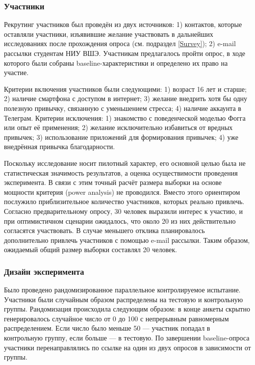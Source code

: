 \documentclass[pdflatex,sn-mathphys-num]{sn-jnl}%
\theoremstyle{thmstyleone}%
\theoremstyle{thmstyletwo}%
\theoremstyle{thmstylethree}%
\begin{document}
\subsubsection{Участники}

Рекрутинг участников был проведён из двух источников: 1) контактов, которые оставляли участники, изъявившие желание участвовать в дальнейших исследованиях после прохождения опроса (см. подраздел \ref{Survey}); 2) e-mail рассылки студентам НИУ ВШЭ. Участникам предлагалось пройти опрос, в ходе которого были собраны baseline-характеристики и определено их право на участие.

Критерии включения участников были следующими: 1) возраст 16 лет и старше; 2) наличие смартфона с доступом в интернет; 3) желание внедрить хотя бы одну полезную привычку, связанную с уменьшением стресса; 4) наличие аккаунта в Телеграм. Критерии исключения: 1) знакомство с поведенческой моделью Фогга или опыт её применения; 2) желание исключительно избавиться от вредных привычек; 3) использование приложений для формирования привычек; 4) уже внедрённая привычка благодарности.

Поскольку исследование носит пилотный характер, его основной целью была не статистическая значимость результатов, а оценка осуществимости проведения эксперимента. В связи с этим точный расчёт размера выборки на основе мощности критерия (power analysis) не проводился. Вместо этого ориентиром послужило приблизительное количество участников, которых реально привлечь. Согласно предварительному опросу, 30 человек выразили интерес к участию, и при оптимистичном сценарии ожидалось, что около 20 из них действительно согласятся участвовать. В случае меньшего отклика планировалось дополнительно привлечь участников с помощью e-mail рассылки. Таким образом, ожидаемый общий размер выборки составлял 20 человек.

\subsubsection{Дизайн эксперимента}

Было проведено рандомизированное параллельное контролируемое испытание. Участники были случайным образом распределены на тестовую и контрольную группы. Рандомизация происходила следующим образом: в конце анкеты скрытно генерировалось случайное число от 0 до 100 с непрерывным равномерным распределением. Если число было меньше 50 — участник попадал в контрольную группу, если больше — в тестовую. По завершении baseline-опроса участники перенаправлялись по ссылке на один из двух опросов в зависимости от группы.
\end{document}
